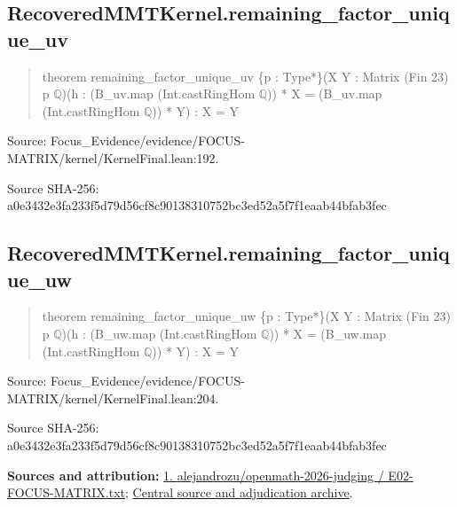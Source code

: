 \documentclass[11pt,a4paper]{article}
\begin{document}
\begin{samepage}
\subsection{RecoveredMMTKernel.remaining\_factor\_unique\_uv}
\begin{quote}\small\ttfamily theorem remaining\_factor\_unique\_uv \{p : Type*\}\newline     (X Y : Matrix (Fin 23) p \ensuremath{\mathbb{Q}})\newline     (h : (B\_uv.map (Int.castRingHom \ensuremath{\mathbb{Q}})) * X = (B\_uv.map (Int.castRingHom \ensuremath{\mathbb{Q}})) * Y) : X = Y\end{quote}
{\small Source: Focus\_Evidence/evidence/FOCUS-MATRIX/kernel/KernelFinal.lean:192.\par}

{\small Source SHA-256: a0e3432e3fa233f5d79d56cf8c90138310752bc3ed52a5f7f1eaab44bfab3fec\par}

\end{samepage}
\begin{samepage}
\subsection{RecoveredMMTKernel.remaining\_factor\_unique\_uw}
\begin{quote}\small\ttfamily theorem remaining\_factor\_unique\_uw \{p : Type*\}\newline     (X Y : Matrix (Fin 23) p \ensuremath{\mathbb{Q}})\newline     (h : (B\_uw.map (Int.castRingHom \ensuremath{\mathbb{Q}})) * X = (B\_uw.map (Int.castRingHom \ensuremath{\mathbb{Q}})) * Y) : X = Y\end{quote}
{\small Source: Focus\_Evidence/evidence/FOCUS-MATRIX/kernel/KernelFinal.lean:204.\par}

{\small Source SHA-256: a0e3432e3fa233f5d79d56cf8c90138310752bc3ed52a5f7f1eaab44bfab3fec\par}

{\small\textbf{Sources and attribution:} \href{https://github.com/alejandrozu/openmath-2026-judging/blob/d0ed487f487fa7ec814ff705ab55249983fe8707/OpenMath-Judging/review/entries/E02-FOCUS-MATRIX.txt}{1. alejandrozu/openmath-2026-judging / E02-FOCUS-MATRIX.txt}; \href{https://github.com/alejandrozu/openmath-2026-judging}{Central source and adjudication archive}.\par}

\end{samepage}
\end{document}
